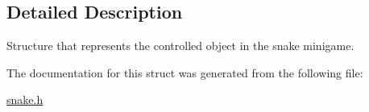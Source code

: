 \subsection{Detailed Description}
Structure that represents the controlled object in the snake minigame. 

The documentation for this struct was generated from the following file\+:\begin{DoxyCompactItemize}
\item 
\mbox{\hyperlink{snake_8h}{snake.\+h}}\end{DoxyCompactItemize}
